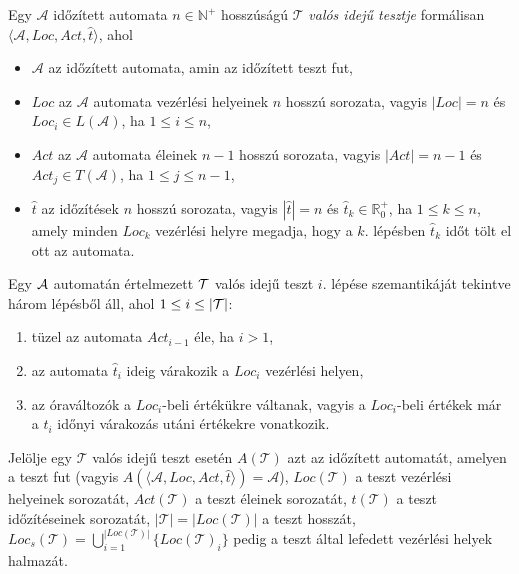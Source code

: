 \begin{definition}
\label{ValósIdejűTeszt}
Egy $\mathcal{A}$ időzített automata $n \in \mathbb{N}^+$ hosszúságú $\mathcal{T}$ \emph{valós idejű tesztje} formálisan $\langle \mathcal{A}, Loc, Act, \hat{t} \rangle$, ahol
\begin{itemize}
    \item $\mathcal{A}$ az időzített automata, amin az időzített teszt fut,
    \item $Loc$ az $\mathcal{A}$ automata vezérlési helyeinek $n$ hosszú sorozata, vagyis $|Loc| = n$ és $Loc_i \in L(\mathcal{A})$, ha $1 \leq i \leq n$,
    \item $Act$ az $\mathcal{A}$ automata éleinek $n-1$ hosszú sorozata, vagyis $|Act| = n-1$ és $Act_j \in T(\mathcal{A})$, ha $1 \leq j \leq n-1$,
    \item $\hat{t}$ az időzítések $n$ hosszú sorozata, vagyis $|\hat{t}| = n$ és $\hat{t}_k \in \mathbb{R}_0^+$, ha $1 \leq k \leq n$, amely minden $Loc_k$ vezérlési helyre megadja, hogy a $k.$ lépésben $\hat{t}_k$ időt tölt el ott az automata.
\end{itemize}
\end{definition}

Egy $\mathcal{A}$ automatán értelmezett $\mathcal{T}$ valós idejű teszt $i.$ lépése szemantikáját tekintve három lépésből áll, ahol $1 \leq i \leq |\mathcal{T}|$:
\begin{enumerate}
    \item tüzel az automata $Act_{i-1}$ éle, ha $i > 1$,
    \item az automata $\hat{t}_{i}$ ideig várakozik a $Loc_i$ vezérlési helyen,
    \item az óraváltozók a $Loc_i$-beli értékükre váltanak, vagyis a $Loc_i$-beli értékek már a $\hat{t}_{i}$ időnyi várakozás utáni értékekre vonatkozik.
\end{enumerate}

Jelölje egy $\mathcal{T}$ valós idejű teszt esetén $A(\mathcal{T})$ azt az időzített automatát, amelyen a teszt fut (vagyis $A(\langle \mathcal{A}, Loc, Act, \hat{t} \rangle) = \mathcal{A}$), $Loc(\mathcal{T})$ a teszt vezérlési helyeinek sorozatát, $Act(\mathcal{T})$ a teszt éleinek sorozatát, $\hat{t}(\mathcal{T})$ a teszt időzítéseinek sorozatát, $|\mathcal{T}| = |Loc(\mathcal{T})|$ a teszt hosszát, $Loc_s(\mathcal{T}) = \bigcup\limits_{i = 1}^{|Loc(\mathcal{T})|} \{ Loc(\mathcal{T})_i \}$ pedig a teszt által lefedett vezérlési helyek halmazát.

